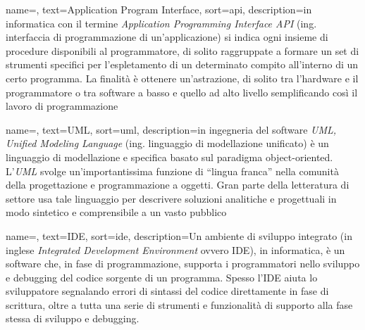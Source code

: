 



 {
    name=,
    text=Application Program Interface,
    sort=api,
    description={in informatica con il termine \emph{Application Programming Interface API} (ing. interfaccia di programmazione di un'applicazione) si indica ogni insieme di procedure disponibili al programmatore, di solito raggruppate a formare un set di strumenti specifici per l'espletamento di un determinato compito all'interno di un certo programma. La finalità è ottenere un'astrazione, di solito tra l'hardware e il programmatore o tra software a basso e quello ad alto livello semplificando così il lavoro di programmazione}
}

 {
    name=,
    text=UML,
    sort=uml,
    description={in ingegneria del software \emph{UML, Unified Modeling Language} (ing. linguaggio di modellazione unificato) è un linguaggio di modellazione e specifica basato sul paradigma object-oriented. L'\emph{UML} svolge un'importantissima funzione di ``lingua franca'' nella comunità della progettazione e programmazione a oggetti. Gran parte della letteratura di settore usa tale linguaggio per descrivere soluzioni analitiche e progettuali in modo sintetico e comprensibile a un vasto pubblico}
}

 {
    name=,
    text=IDE,
    sort=ide,
    description={Un ambiente di sviluppo integrato (in inglese \emph{Integrated Development Environment} ovvero IDE), in informatica, è un software che, in fase di programmazione, supporta i programmatori nello sviluppo e debugging del codice sorgente di un programma.
    Spesso l'IDE aiuta lo sviluppatore segnalando errori di sintassi del codice direttamente in fase di scrittura, oltre a tutta una serie di strumenti e funzionalità di supporto alla fase stessa di sviluppo e debugging.}
}

